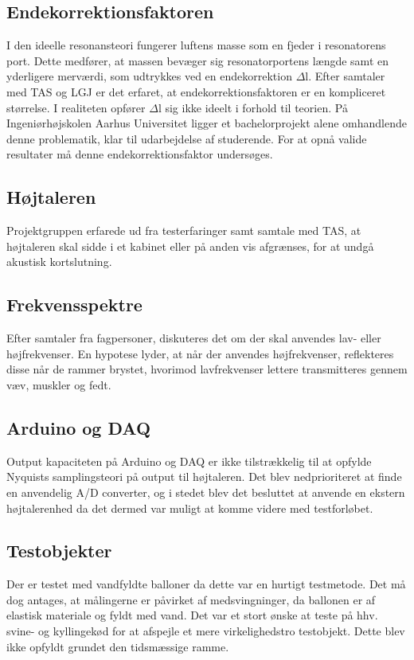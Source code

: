 \subsection{Endekorrektionsfaktoren}
I den ideelle resonansteori fungerer luftens masse som en fjeder i resonatorens port. Dette medfører, at massen bevæger sig resonatorportens længde samt en yderligere merværdi, som udtrykkes ved en endekorrektion $\Delta$l.
Efter samtaler med TAS og LGJ er det erfaret, at endekorrektionsfaktoren er en kompliceret størrelse. I realiteten opfører $\Delta$l sig ikke ideelt i forhold til teorien. På Ingeniørhøjskolen Aarhus Universitet ligger et bachelorprojekt alene omhandlende denne problematik, klar til udarbejdelse af studerende. For at opnå valide resultater må denne endekorrektionsfaktor undersøges. 

\subsection{Højtaleren}
Projektgruppen erfarede ud fra testerfaringer samt samtale med TAS, at højtaleren skal sidde i et kabinet eller på anden vis afgrænses, for at undgå akustisk kortslutning.  

\subsection{Frekvensspektre}
Efter samtaler fra fagpersoner, diskuteres det om der skal anvendes lav- eller højfrekvenser. En hypotese lyder, at når der anvendes højfrekvenser, reflekteres disse når de rammer brystet, hvorimod lavfrekvenser lettere transmitteres gennem væv, muskler og fedt.

\subsection{Arduino og DAQ}
Output kapaciteten på Arduino og DAQ er ikke tilstrækkelig til at opfylde Nyquists samplingsteori på output til højtaleren. Det blev nedprioriteret at finde en anvendelig A/D converter, og i stedet blev det besluttet at anvende en ekstern højtalerenhed da det dermed var muligt at komme videre med testforløbet. 

\subsection{Testobjekter}
Der er testet med vandfyldte balloner da dette var en hurtigt testmetode. Det må dog antages, at målingerne er påvirket af medsvingninger, da ballonen er af elastisk materiale og fyldt med vand. Det var et stort ønske at teste på hhv. svine- og kyllingekød for at afspejle et mere virkelighedstro testobjekt. Dette blev ikke opfyldt grundet den tidsmæssige ramme.  

 


